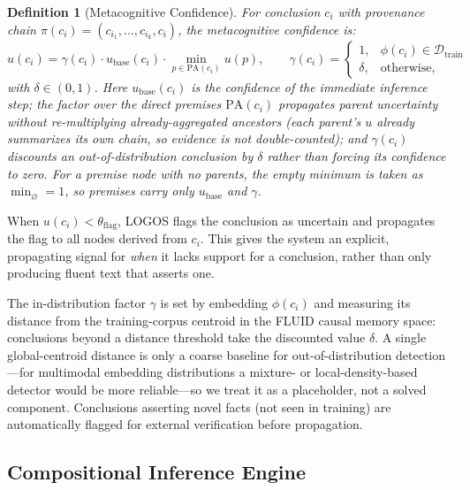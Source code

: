 \documentclass[12pt]{article}
\newtheorem{definition}{Definition}
\begin{document}
\begin{definition}[Metacognitive Confidence]
For conclusion $c_i$ with provenance chain $\pi(c_i) = (c_{i_1}, \ldots, c_{i_k}, c_i)$, the metacognitive confidence is:
\begin{equation}
u(c_i) = \gamma(c_i)\cdot u_{\text{base}}(c_i)\cdot \min_{p \in \mathrm{PA}(c_i)} u(p),
\qquad
\gamma(c_i) = \begin{cases} 1, & \phi(c_i) \in \mathcal{D}_{\text{train}}\\[2pt] \delta, & \text{otherwise},\end{cases}
\end{equation}
with $\delta \in (0,1)$. Here $u_{\text{base}}(c_i)$ is the confidence of the immediate inference step; the factor over the \emph{direct} premises $\mathrm{PA}(c_i)$ propagates parent uncertainty without re-multiplying already-aggregated ancestors (each parent's $u$ already summarizes its own chain, so evidence is not double-counted); and $\gamma(c_i)$ discounts an out-of-distribution conclusion by $\delta$ rather than forcing its confidence to zero. For a premise node with no parents, the empty minimum is taken as $\min_{\varnothing} = 1$, so premises carry only $u_{\text{base}}$ and $\gamma$.
\end{definition}

When $u(c_i) < \theta_{\text{flag}}$, LOGOS flags the conclusion as uncertain and propagates the flag to all nodes derived from $c_i$. This gives the system an explicit, propagating signal for \emph{when} it lacks support for a conclusion, rather than only producing fluent text that asserts one.

The in-distribution factor $\gamma$ is set by embedding $\phi(c_i)$ and measuring its distance from the training-corpus centroid in the FLUID causal memory space: conclusions beyond a distance threshold take the discounted value $\delta$. A single global-centroid distance is only a coarse baseline for out-of-distribution detection---for multimodal embedding distributions a mixture- or local-density-based detector would be more reliable---so we treat it as a placeholder, not a solved component. Conclusions asserting novel facts (not seen in training) are automatically flagged for external verification before propagation.

\subsection{Compositional Inference Engine}
\end{document}
